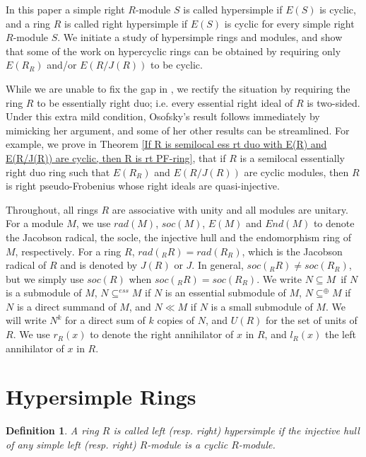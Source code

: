 \documentclass{amsart}
\theoremstyle{plain}
\newtheorem{definition}[theorem]{Definition}
\numberwithin{equation}{section}
\begin{document}
\bigskip In this paper a simple right $R$-module $S$ is called hypersimple if $E (S)$ is cyclic, and a ring $R$ is called right hypersimple if $E (S)$ is cyclic for every simple right $R$-module $S$. We initiate a study of hypersimple rings and modules, and show that some of the work on hypercyclic rings can be obtained by requiring
only $E (R_{R})$ and/or $E (R/J (R))$ to be cyclic. 

\bigskip While we are unable to fix the gap in \cite[Proposition 1.6]{O1},
we rectify the situation by requiring the ring $R$ to be essentially right duo; i.e. every essential right ideal of $R$ is two-sided. Under this extra mild condition, Osofsky's result follows immediately by mimicking her argument, and some of her other results can be streamlined.  For example, we prove in Theorem \ref{If R is semilocal ess rt duo with E(R) and E(R/J(R)) are cyclic, then R is rt PF-ring}, that if
$R$ is a semilocal essentially right duo ring such that $E (R_{R})$ and $E (R/J (R))$ are cyclic modules, then $R$ is right pseudo-Frobenius whose right ideals are quasi-injective. 

\bigskip Throughout,
all rings $R$ are associative with unity and all modules are unitary. For a module $M$, we use $r a d (M)$, $s o c (M)$, $E (M)$ and $E n d (M)$ to denote the Jacobson radical, the socle, the injective hull and the endomorphism ring of $M$, respectively$\text{.}$ For a ring $R$, $r a d (_{R} R) =r a d (R_{R})$, which is the Jacobson radical of $R$ and is denoted by $J (R)$ or $J$. In general, $s o c (_{R} R) \neq s o c (R_{R})$, but we simply use $s o c (R)$ when $s o c (_{R} R) =s o c (R_{R})$. We write $N \subseteq M$\ if $N$ is a submodule of $M$, $N  \subseteq ^{e s s}M$ if $N$ is an essential submodule of $M$, $N  \subseteq ^{ \oplus }M$ if $N$ is a direct summand of $M$, and $N \ll M$ if $N$ is a small submodule of $M$. We will write $N^{k}$ for a direct sum of $k$ copies of $N$, and $U (R)$ for the set of units of $R$. We use $r_{R} (x)$ to denote the right annihilator of $x$ in $R$, and $l_{R} (x)$ the left annihilator of $x$ in $R$. 

\bigskip 

\section{Hypersimple Rings}
\begin{definition}
A ring $R$ is called left (resp. right)  {hypersimple} if the injective hull of any simple left (resp. right) $R$-module is a cyclic $R$-module. 
\end{definition}
\end{document}
